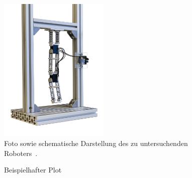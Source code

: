 \documentclass{MSM_latex}
\begin{document}
\begin{figure}[t]
	\centering
	\includegraphics[height=7cm]{img/Versuchsaufbau.png}
	\hspace{1cm}
	\def\svgwidth{5.5cm}
	
	\caption{Foto sowie schematische Darstellung des zu untersuchenden Roboters~\cite{Fuchs23}.}
	\label{fig:Roboter}
\end{figure}

\def\myLineWidth{1.5pt}

%
% 
\begin{figure}[t]
	\centering
	
	\caption{Beispielhafter Plot}
	\label{fig:plot_example}
\end{figure}



\end{document}
